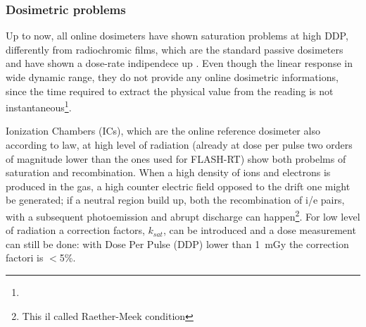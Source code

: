         \subsubsection{Dosimetric problems}
            Up to now, all online dosimeters have shown saturation problems at high DDP, differently from radiochromic films, which are the standard passive dosimeters and have shown a dose-rate indipendece up .
            Even though the linear response in wide dynamic range, they do not provide any online dosimetric informations, since the time required to extract the physical value from the reading is not instantaneous\footnote{}.

            Ionization Chambers (ICs), which are the online reference dosimeter also according to law, at high level of radiation (already at dose per pulse two orders of magnitude lower than the ones used for FLASH-RT) show both probelms of saturation and recombination. When a high density of ions and electrons is produced in the gas, a high counter electric field opposed to the drift one might be generated; if a neutral region build up, both the recombination of i/e pairs, with a subsequent photoemission and abrupt discharge can happen\footnote{This il called Raether-Meek condition}. For low level of radiation a correction factors, $k_{sat}$, can be introduced and a dose measurement can still be done: with Dose Per Pulse (DDP) lower than \SI{1}{mGy} the correction factori is $<$5\%. 
                        
